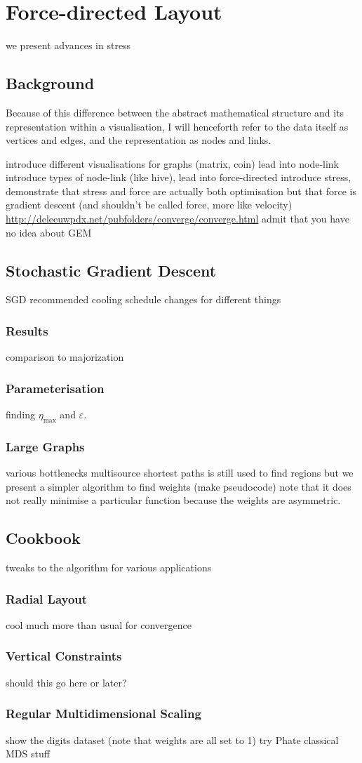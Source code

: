 \chapter{Force-directed Layout}
we present advances in stress

\section{Background}
Because of this difference between the abstract mathematical structure and its representation within a visualisation, I will henceforth refer to the data itself as vertices and edges, and the representation as nodes and links.

introduce different visualisations for graphs (matrix, coin) lead into node-link
introduce types of node-link (like hive), lead into force-directed
introduce stress, demonstrate that stress and force are actually both optimisation but that force is gradient descent (and shouldn't be called force, more like velocity)
\url{http://deleeuwpdx.net/pubfolders/converge/converge.html}
admit that you have no idea about GEM 

\section{Stochastic Gradient Descent}
SGD
recommended cooling schedule changes for different things
\subsection{Results}
comparison to majorization
\subsection{Parameterisation}
finding $\eta_{\max}$ and $\varepsilon$.
\subsection{Large Graphs}
various bottlenecks
multisource shortest paths is still used to find regions
but we present a simpler algorithm to find weights (make pseudocode)
note that it does not really minimise a particular function because the weights are asymmetric.

\section{Cookbook}
tweaks to the algorithm for various applications
\subsection{Radial Layout}
cool much more than usual for convergence
\subsection{Vertical Constraints}
should this go here or later?
\subsection{Regular Multidimensional Scaling}
show the digits dataset (note that weights are all set to 1)
try Phate classical MDS stuff